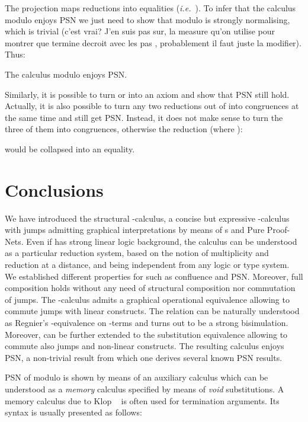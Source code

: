 \documentclass{LMCS}
\newcommand{\ie}{{\it  i.e.}~}
\renewcommand{\>}{\rightarrow}
\begin{document}
{The projection  maps reductions  into equalities (\ie ). To infer that the calculus  modulo  enjoys PSN we just need to show that  modulo  is strongly normalising, which is trivial 
(c'est vrai? J'en suis pas sur, la measure qu'on utilise pour montrer que  termine decroit avec les pas , probablement il faut juste la modifier). Thus:

\begin{thm}
The calculus  modulo  enjoys PSN.
\end{thm}

Similarly, it is possible to turn  or  into 
an axiom and show that PSN still hold. Actually, it is also possible
to turn any two reductions out of  into
congruences at the same time and still get PSN. Instead, it does not
make sense to turn the three of them into congruences, otherwise the
reduction (where ):


would be collapsed into an equality.
}


\section{Conclusions}



We  have introduced  the  structural -calculus,  a concise  but
expressive   -calculus  with  jumps   admitting
graphical interpretations  by means of s  and Pure Proof-Nets.
Even if   has strong linear logic background,  the calculus can
be understood as a particular reduction system, based on the notion of
multiplicity and reduction at a distance, and being independent from
any  logic or  type system.  We established  different  properties for
 such as confluence  and PSN.  Moreover, full composition holds
without any  need of  structural composition nor  commutation of
jumps.  The -calculus  admits a graphical operational equivalence
 allowing to commute jumps with linear constructs.  The relation
 can  be naturally understood  as Regnier's -equivalence
on -terms  and turns out  to be a strong  bisimulation.  Moreover,
 can be further  extended to the substitution equivalence 
allowing  to  commute  also  jumps  and  non-linear  constructs.   The
resulting  calculus enjoys PSN,  a non-trivial  result from  which one
derives several known PSN results.

PSN  of   modulo    is shown  by  means  of an  auxiliary
calculus    which  can  be  understood  as  a  \textit{memory}
calculus specified by  means of \textit{void} substitutions.  
A memory calculus due to Klop ~\cite{Klo} is often used for termination
arguments. Its syntax is usually presented as follows:
\end{document}

